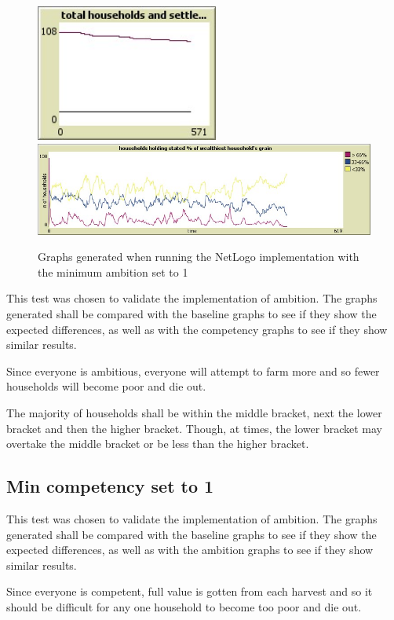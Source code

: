 \documentclass[12pt]{article}
\begin{document}
				\begin{figure}[!htb]
					\includegraphics[width=6cm]{Min_ambition_run1_C}\\
					\includegraphics[width=15cm]{Min_ambition_run1_D}
					\caption{Graphs generated when running the NetLogo implementation with the minimum ambition set to 1}
					\label{fig:Min_Ambition_enabled_Netlogo_1}
				\end{figure}
				This test was chosen to validate the implementation of ambition. The graphs generated shall be compared with the baseline graphs to see if they show the expected differences, as well as with the competency graphs to see if they show similar results.
		
				Since everyone is ambitious, everyone will attempt to farm more and so fewer households will become poor and die out.
		
				The majority of households shall be within the middle bracket, next the lower bracket and then the higher bracket. Though, at times, the lower bracket may overtake the middle bracket or be less than the higher bracket.
		
		
			\subsection{Min competency set to 1}
				This test was chosen to validate the implementation of ambition. The graphs generated shall be compared with the baseline graphs to see if they show the expected differences, as well as with the ambition graphs to see if they show similar results.
		
				Since everyone is competent, full value is gotten from each harvest and so it should be difficult for any one household to become too poor and die out.
		
\end{document}
